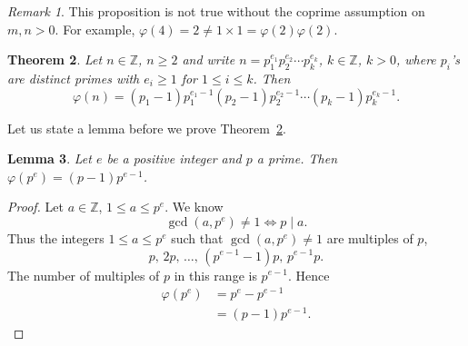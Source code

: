 \documentclass{amsbook}
\theoremstyle{plain}
\newtheorem{theorem}{Theorem}[chapter] %
\newtheorem{lemma}[theorem]{Lemma}
\theoremstyle{definition}
\theoremstyle{remark}
\newtheorem{remark}[theorem]{Remark}
\numberwithin{equation}{chapter}
\numberwithin{figure}{chapter}
\newcommand{\Z}{\mathbb{Z}}
\begin{document}
\begin{remark}
  This proposition is not true without the coprime assumption on $m, n > 0$. For example, $\varphi(4) = 2 \neq 1 \times 1 = \varphi(2) \varphi(2)$.
\end{remark}
\begin{theorem}\label{thm:phi_n}
  Let $n \in \Z$, $n \geqslant 2$ and write $n = p_1^{e_1}p_2^{e_2}\cdots p_k^{e_k}$, $k \in \Z$, $k > 0$, where $p_i$'s are distinct primes with $e_i \geqslant 1$ for $1 \leqslant i \leqslant k$. Then 
\[
\varphi(n) = (p_1 - 1)p_1^{e_1-1}(p_2 - 1)p_2^{e_2-1}\cdots (p_k - 1)p_k^{e_k-1}.
\]
\end{theorem}
Let us state a lemma before we prove Theorem~\ref{thm:phi_n}.
\begin{lemma}\label{lem:phi_p}
  Let $e$ be a positive integer and $p$ a prime. Then $\varphi(p^e) = (p-1)p^{e-1}$.
\end{lemma}
\begin{proof}
  Let $a \in \Z$, $1 \leqslant a \leqslant p^e$. We know
  \[
    \gcd (a, p^e) \neq 1 \iff p \mid a.
  \]
  Thus the integers $1 \leqslant a \leqslant p^e$ such that $\gcd (a, p^e) \neq 1$ are multiples of $p$, 
  \[
    p, \, 2p, \, \ldots, \, (p^{e-1}-1)p, \, p^{e-1}p.
  \]
  The number of multiples of $p$ in this range is $p^{e-1}$. Hence
  \begin{align}
    \varphi(p^e) &= p^e - p^{e-1} \\
                 &= (p-1) p^{e-1}.
  \end{align}
\end{proof}
\end{document}
